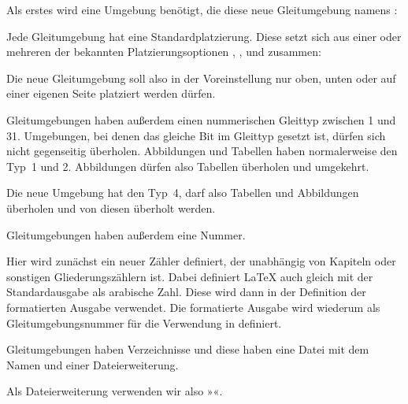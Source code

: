Als erstes wird eine Umgebung benötigt, die diese neue
Gleitumgebung \iftrue%
namens :%
\else%
bereitstellt. Das geht ganz einfach mit:
\fi%
\begin{lstcode}
  \newenvironment{remarkbox}%
    {\@float{remarkbox}}%
    {\end@float}
\end{lstcode}
\iffalse Die neue Umgebung heißt also \Environment{remarkbox}.\fi %

Jede Gleitumgebung hat eine Standardplatzierung. Diese
setzt sich aus einer oder mehreren der bekannten Platzierungsoptionen
, ,  und  zusammen:
\begin{lstcode}
  \newcommand*{\fps@remarkbox}{tbp}
\end{lstcode}
Die neue Gleitumgebung soll also in der Voreinstellung nur oben, unten oder
auf einer eigenen Seite platziert werden dürfen.

Gleitumgebungen haben außerdem einen nummerischen Gleittyp
zwischen 1 und 31. Umgebungen, bei denen das gleiche Bit
im Gleittyp gesetzt ist, dürfen sich nicht gegenseitig überholen. Abbildungen
und Tabellen haben normalerweise den Typ~1 und 2. Abbildungen dürfen also
Tabellen überholen und umgekehrt.
\begin{lstcode}
  \newcommand*{\ftype@remarkbox}{4}
\end{lstcode}
Die neue Umgebung hat den Typ~4, darf also Tabellen und Abbildungen überholen
und von diesen überholt werden.

Gleitumgebungen haben außerdem eine Nummer.
\begin{lstcode}
  \newcommand*{\remarkboxformat}{%
    Merksatz~\theremarkbox\csname autodot\endcsname
  }
  \newcommand*{\fnum@remarkbox}{\remarkboxformat}
\end{lstcode}
Hier wird zunächst ein neuer Zähler definiert, der unabhängig von Kapiteln
oder sonstigen Gliederungszählern ist. Dabei definiert \LaTeX{} auch gleich
 mit der Standardausgabe als arabische Zahl. Diese wird
dann in der Definition der formatierten Ausgabe verwendet. Die formatierte
Ausgabe wird wiederum als Gleitumgebungsnummer für die Verwendung in
 definiert.

Gleitumgebungen haben Verzeichnisse und diese haben
eine Datei mit dem Namen  und einer Dateierweiterung.
\begin{lstcode}
  \newcommand*{\ext@remarkbox}{lor}
\end{lstcode}
Als Dateierweiterung verwenden wir also »«.

